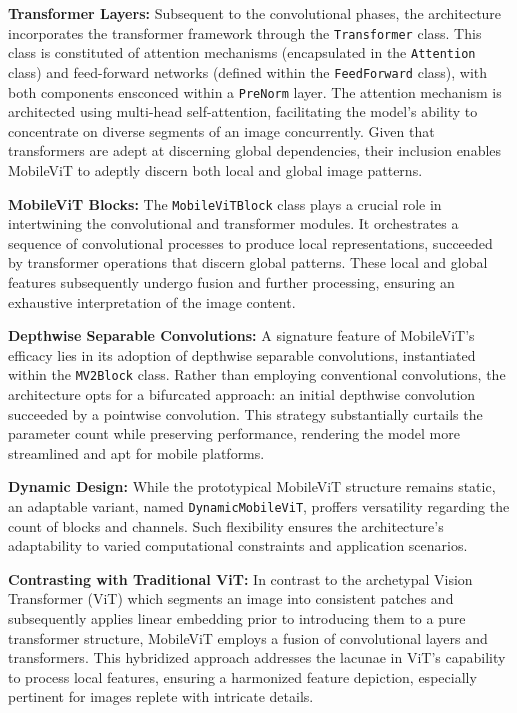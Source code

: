 \documentclass[10pt,twocolumn,letterpaper]{article}
\begin{document}
\textbf{Transformer Layers:}
Subsequent to the convolutional phases, the architecture incorporates the transformer framework through the \texttt{Transformer} class. This class is constituted of attention mechanisms (encapsulated in the \texttt{Attention} class) and feed-forward networks (defined within the \texttt{FeedForward} class), with both components ensconced within a \texttt{PreNorm} layer. The attention mechanism is architected using multi-head self-attention, facilitating the model's ability to concentrate on diverse segments of an image concurrently. Given that transformers are adept at discerning global dependencies, their inclusion enables MobileViT to adeptly discern both local and global image patterns.

\textbf{MobileViT Blocks:}
The \texttt{MobileViTBlock} class plays a crucial role in intertwining the convolutional and transformer modules. It orchestrates a sequence of convolutional processes to produce local representations, succeeded by transformer operations that discern global patterns. These local and global features subsequently undergo fusion and further processing, ensuring an exhaustive interpretation of the image content.

\textbf{Depthwise Separable Convolutions:}
A signature feature of MobileViT's efficacy lies in its adoption of depthwise separable convolutions, instantiated within the \texttt{MV2Block} class. Rather than employing conventional convolutions, the architecture opts for a bifurcated approach: an initial depthwise convolution succeeded by a pointwise convolution. This strategy substantially curtails the parameter count while preserving performance, rendering the model more streamlined and apt for mobile platforms.

\textbf{Dynamic Design:}
While the prototypical MobileViT structure remains static, an adaptable variant, named \texttt{DynamicMobileViT}, proffers versatility regarding the count of blocks and channels. Such flexibility ensures the architecture's adaptability to varied computational constraints and application scenarios.

\textbf{Contrasting with Traditional ViT:}
In contrast to the archetypal Vision Transformer (ViT) which segments an image into consistent patches and subsequently applies linear embedding prior to introducing them to a pure transformer structure, MobileViT employs a fusion of convolutional layers and transformers. This hybridized approach addresses the lacunae in ViT's capability to process local features, ensuring a harmonized feature depiction, especially pertinent for images replete with intricate details.
\end{document}
